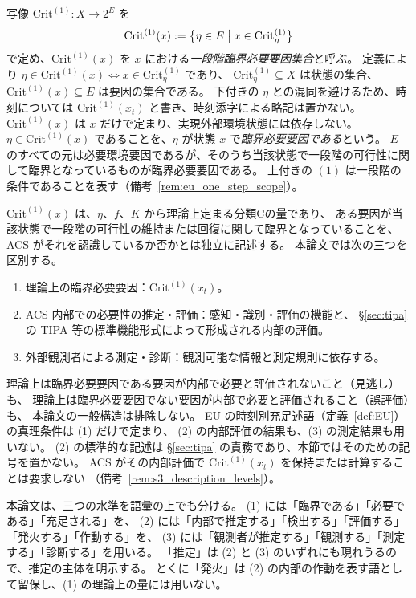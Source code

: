 \begin{definition}
\label{def:eu_fire}
写像 $\mathrm{Crit}^{(1)}:X\to 2^{E}$ を
\[
  \mathrm{Crit}^{(1)}(x)
  :=
  \bigl\{
    \eta\in E
    \bigm|
    x\in\mathrm{Crit}^{(1)}_\eta
  \bigr\}
\]
で定め、$\mathrm{Crit}^{(1)}(x)$ を $x$ における\emph{一段階臨界必要要因集合}と呼ぶ。
定義により $\eta\in\mathrm{Crit}^{(1)}(x)\iff x\in\mathrm{Crit}^{(1)}_\eta$ であり、
$\mathrm{Crit}^{(1)}_\eta\subseteq X$ は状態の集合、$\mathrm{Crit}^{(1)}(x)\subseteq E$ は要因の集合である。
下付きの $\eta$ との混同を避けるため、時刻については $\mathrm{Crit}^{(1)}(x_t)$ と書き、時刻添字による略記は置かない。
$\mathrm{Crit}^{(1)}(x)$ は $x$ だけで定まり、実現外部環境状態には依存しない。
$\eta\in\mathrm{Crit}^{(1)}(x)$ であることを、$\eta$ が状態 $x$ で\emph{臨界必要要因である}という。
$E$ のすべての元は必要環境要因であるが、そのうち当該状態で一段階の可行性に関して臨界となっているものが臨界必要要因である。
上付きの $(1)$ は一段階の条件であることを表す（備考~\ref{rem:eu_one_step_scope}）。
\end{definition}

\begin{remark}[一段階臨界必要要因集合の記述水準]
\label{rem:crit_description_level}
$\mathrm{Crit}^{(1)}(x)$ は、$\eta$、$f$、$K$ から理論上定まる分類Cの量であり、
ある要因が当該状態で一段階の可行性の維持または回復に関して臨界となっていることを、
ACS がそれを認識しているか否かとは独立に記述する。
本論文では次の三つを区別する。
\begin{enumerate}
  \item 理論上の臨界必要要因：$\mathrm{Crit}^{(1)}(x_t)$。
  \item ACS 内部での必要性の推定・評価：感知・識別・評価の機能と、
  \S\ref{sec:tipa} の TIPA 等の標準機能形式によって形成される内部の評価。
  \item 外部観測者による測定・診断：観測可能な情報と測定規則に依存する。
\end{enumerate}
理論上は臨界必要要因である要因が内部で必要と評価されないこと（見逃し）も、
理論上は臨界必要要因でない要因が内部で必要と評価されること（誤評価）も、
本論文の一般構造は排除しない。
EU の時刻別充足述語（定義~\ref{def:EU}）の真理条件は (1) だけで定まり、
(2) の内部評価の結果も、(3) の測定結果も用いない。
(2) の標準的な記述は \S\ref{sec:tipa} の責務であり、本節ではそのための記号を置かない。
ACS がその内部評価で $\mathrm{Crit}^{(1)}(x_t)$ を保持または計算することは要求しない
（備考~\ref{rem:s3_description_levels}）。

本論文は、三つの水準を語彙の上でも分ける。
(1) には「臨界である」「必要である」「充足される」を、
(2) には「内部で推定する」「検出する」「評価する」「発火する」「作動する」を、
(3) には「観測者が推定する」「観測する」「測定する」「診断する」を用いる。
「推定」は (2) と (3) のいずれにも現れうるので、推定の主体を明示する。
とくに「発火」は (2) の内部の作動を表す語として留保し、(1) の理論上の量には用いない。
\end{remark}

